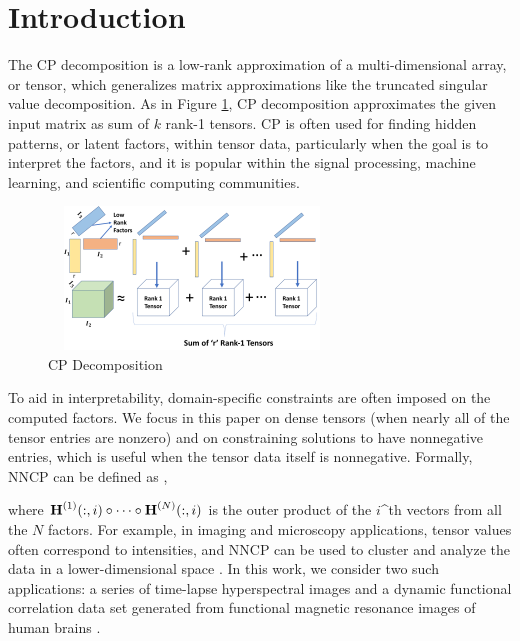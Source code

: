 
\section{Introduction}

The CP decomposition is a low-rank approximation of a multi-dimensional array, or tensor, which generalizes matrix approximations like the truncated singular value decomposition. As in Figure \ref{fig:cpdecomposition}, CP decomposition approximates the given input matrix as sum of $k$ rank-1 tensors.  CP is often used for finding hidden patterns, or latent factors, within tensor data, particularly when the goal is to interpret the factors, and it is popular within the signal processing, machine learning, and scientific computing communities.

\begin{figure}[htbp]
\begin{center}
\includegraphics[width=3in, height=1.5in]{fig/cpdecomposition.pdf}
\caption{CP Decomposition}
\label{fig:cpdecomposition}
\end{center}
\end{figure}


To aid in interpretability, domain-specific constraints are often imposed on the computed factors.
We focus in this paper on dense tensors (when nearly all of the tensor entries are nonzero) and on constraining solutions to have nonnegative entries, which is useful when the tensor data itself is nonnegative. Formally, NNCP can be defined as
, 

where $\Mn{H}{1}(:,i) \circ \cdots \circ \Mn{H}{N}(:,i)$ is the outer product of the $i$^{th} vectors from all the $N$ factors. 
For example, in imaging and microscopy applications, tensor values often correspond to intensities, and NNCP can be used to cluster and analyze the data in a lower-dimensional space \cite{JC+16}.
In this work, we consider two such applications: a series of time-lapse hyperspectral images \cite{FAN16} and a dynamic functional correlation data set generated from functional magnetic resonance images of human brains \cite{VEU+12}.


